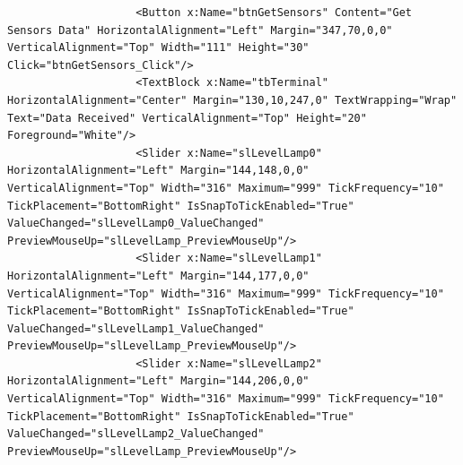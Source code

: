 \begin{lstlisting}
                    <Button x:Name="btnGetSensors" Content="Get Sensors Data" HorizontalAlignment="Left" Margin="347,70,0,0" VerticalAlignment="Top" Width="111" Height="30" Click="btnGetSensors_Click"/>
                    <TextBlock x:Name="tbTerminal" HorizontalAlignment="Center" Margin="130,10,247,0" TextWrapping="Wrap" Text="Data Received" VerticalAlignment="Top" Height="20" Foreground="White"/>
                    <Slider x:Name="slLevelLamp0" HorizontalAlignment="Left" Margin="144,148,0,0" VerticalAlignment="Top" Width="316" Maximum="999" TickFrequency="10" TickPlacement="BottomRight" IsSnapToTickEnabled="True" ValueChanged="slLevelLamp0_ValueChanged" PreviewMouseUp="slLevelLamp_PreviewMouseUp"/>
                    <Slider x:Name="slLevelLamp1" HorizontalAlignment="Left" Margin="144,177,0,0" VerticalAlignment="Top" Width="316" Maximum="999" TickFrequency="10" TickPlacement="BottomRight" IsSnapToTickEnabled="True" ValueChanged="slLevelLamp1_ValueChanged" PreviewMouseUp="slLevelLamp_PreviewMouseUp"/>
                    <Slider x:Name="slLevelLamp2" HorizontalAlignment="Left" Margin="144,206,0,0" VerticalAlignment="Top" Width="316" Maximum="999" TickFrequency="10" TickPlacement="BottomRight" IsSnapToTickEnabled="True" ValueChanged="slLevelLamp2_ValueChanged" PreviewMouseUp="slLevelLamp_PreviewMouseUp"/>


\end{lstlisting}
